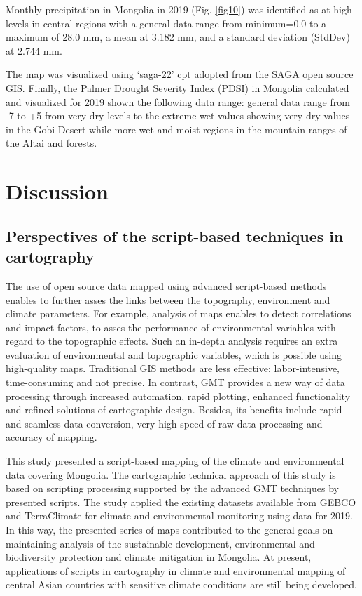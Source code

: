 \documentclass[geosciences,article,submit,pdftex,moreauthors]{Definitions/mdpi}
\begin{document}
Monthly precipitation in Mongolia in 2019 (Fig. \ref{fig10}) was identified as at high levels in central regions with a general data range from minimum=0.0 to a maximum of 28.0 mm, a mean at 3.182 mm, and a standard deviation (StdDev) at 2.744 mm. 

The map was visualized using ‘saga-22’ cpt adopted from the SAGA open source GIS. Finally, the Palmer Drought Severity Index (PDSI) in Mongolia calculated and visualized for 2019 shown the following data range: general data range from -7 to +5 from very dry levels to the extreme wet values showing very dry values in the Gobi Desert while more wet and moist regions in the mountain ranges of the Altai and forests. 

\section{Discussion}
\subsection{Perspectives of the script-based techniques in cartography}

The use of open source data mapped using advanced script-based methods enables to further asses the links between the topography, environment and climate parameters. For example, analysis of maps enables to detect correlations and impact factors, to asses the performance of environmental variables with regard to the topographic effects. Such an in-depth analysis requires an extra evaluation of environmental and topographic variables, which is possible using high-quality maps. Traditional GIS methods are less effective: labor-intensive, time-consuming and not precise. In contrast, GMT provides a new way of data processing through increased automation, rapid plotting, enhanced functionality and refined solutions of cartographic design. Besides, its benefits include rapid and seamless data conversion, very high speed of raw data processing and accuracy of mapping. 

This study presented a script-based mapping of the climate and environmental data covering Mongolia. The cartographic technical approach of this study is based on scripting processing supported by the advanced GMT techniques by presented scripts. The study applied the existing datasets available from GEBCO and TerraClimate for climate and environmental monitoring using data for 2019. In this way, the presented series of maps contributed to the general goals on maintaining analysis of the sustainable development, environmental and biodiversity protection and climate mitigation in Mongolia. At present, applications of scripts in cartography in climate and environmental mapping of central Asian countries with sensitive climate conditions are still being developed. 
\end{document}
